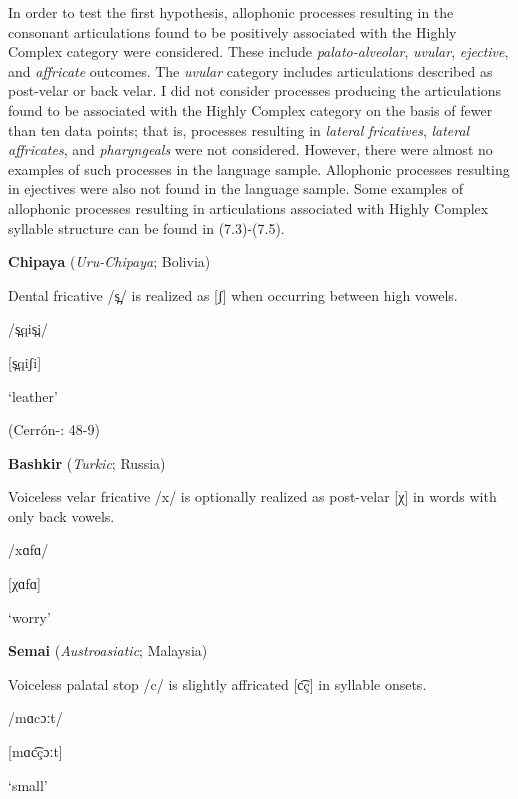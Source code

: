   In order to test the first hypothesis, allophonic processes resulting in the consonant articulations found to be positively associated with the Highly Complex category were considered. These include \textit{palato-alveolar}, \textit{uvular}, \textit{ejective}, and \textit{affricate} outcomes. The \textit{uvular} category includes articulations described as post-velar or back velar. I did not consider processes producing the articulations found to be associated with the Highly Complex category on the basis of fewer than ten data points; that is, processes resulting in \textit{lateral} \textit{fricatives}, \textit{lateral} \textit{affricates}, and \textit{pharyngeals} were not considered. However, there were almost no examples of such processes in the language sample. Allophonic processes resulting in ejectives were also not found in the language sample. Some examples of allophonic processes resulting in articulations associated with Highly Complex syllable structure can be found in (7.3)-(7.5).

\ea\label{ex:(7.3)}
  \textbf{Chipaya} (\textit{Uru-Chipaya}; Bolivia)

Dental fricative /s̪/ is realized as [ʃ] when occurring between high vowels.

/s̪qis̪i/

[s̪qiʃi]

‘leather’

(Cerrón-\citealt{Palomino2006}: 48-9)

\z

\ea\label{ex:(7.4)}
  \textbf{Bashkir} (\textit{Turkic}; Russia)

Voiceless velar fricative /x/ is optionally realized as post-velar [χ] in words with only back vowels.

/xɑfɑ/

[χɑfɑ]

‘worry’

\citep[11]{Poppe1964}

\z

\ea\label{ex:(7.5)}
  \textbf{Semai} (\textit{Austroasiatic}; Malaysia)

Voiceless palatal stop /c/ is slightly affricated [c͡ç] in syllable onsets.

/mɑcɔːt/

[mɑc͡çɔːt]

‘small’

\citep[5]{Philips2007}
\z

